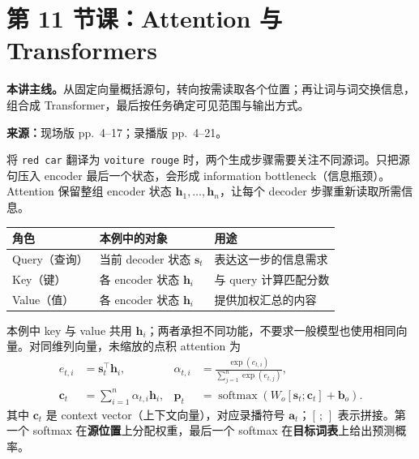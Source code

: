 
\begingroup
\linespread{1.15}\selectfont
\setlength{\parskip}{0.4em}
\renewcommand{\recordid}[1]{}
\renewcommand{\relatedexercise}[2]{\hyperref[exercise:#1]{#2}}
\section{第 11 节课：Attention 与 Transformers}
\label{lecture:SC4002-L11}


\textbf{本讲主线。}从固定向量概括源句，转向按需读取各个位置；再让词与词交换信息，组合成 Transformer，最后按任务确定可见范围与输出方式。

\nopagebreak[4]
\textbf{来源：}现场版 pp.~4--17；录播版 pp.~4--21。
\nopagebreak[4]

将 \texttt{red car} 翻译为 \texttt{voiture rouge} 时，两个生成步骤需要关注不同源词。只把源句压入 encoder 最后一个状态，会形成 information bottleneck（信息瓶颈）。Attention 保留整组 encoder 状态 $\mathbf h_1,\ldots,\mathbf h_n$，让每个 decoder 步骤重新读取所需信息。

\begin{center}
\small
\begin{tabular}{@{}lll@{}}
\toprule
角色 & 本例中的对象 & 用途 \\
\midrule
Query（查询） & 当前 decoder 状态 $\mathbf s_t$ & 表达这一步的信息需求 \\
Key（键） & 各 encoder 状态 $\mathbf h_i$ & 与 query 计算匹配分数 \\
Value（值） & 各 encoder 状态 $\mathbf h_i$ & 提供加权汇总的内容 \\
\bottomrule
\end{tabular}
\end{center}

本例中 key 与 value 共用 $\mathbf h_i$；两者承担不同功能，不要求一般模型也使用相同向量。对同维列向量，未缩放的点积 attention 为
\begin{align*}
 e_{t,i}&=\mathbf s_t^\top\mathbf h_i, &
 \alpha_{t,i}&=\frac{\exp(e_{t,i})}{\sum_{j=1}^{n}\exp(e_{t,j})},\\
 \mathbf c_t&=\sum_{i=1}^{n}\alpha_{t,i}\mathbf h_i, &
 \mathbf p_t&=\operatorname{softmax}\!\left(W_o[\mathbf s_t;\mathbf c_t]+\mathbf b_o\right).
\end{align*}
其中 $\mathbf c_t$ 是 context vector（上下文向量），对应录播符号 $\mathbf a_t$；$[\,;\,]$ 表示拼接。第一个 softmax 在\textbf{源位置}上分配权重，最后一个 softmax 在\textbf{目标词表}上给出预测概率。

